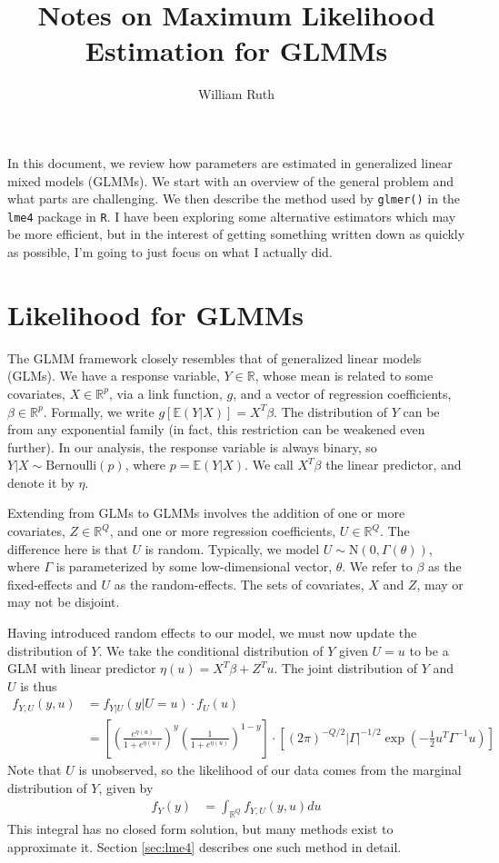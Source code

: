 \documentclass{article}
\title{Notes on Maximum Likelihood Estimation for GLMMs}
\author{William Ruth}
\date{}
\newcommand{\bE}{\mathbb{E}}
\newcommand{\bR}{\mathbb{R}}
\begin{document}
\maketitle

In this document, we review how parameters are estimated in generalized linear mixed models (GLMMs). We start with an overview of the general problem and what parts are challenging. We then describe the method used by \texttt{glmer()} in the \texttt{lme4} package in \texttt{R}. I have been exploring some alternative estimators which may be more efficient, but in the interest of getting something written down as quickly as possible, I'm going to just focus on what I actually did.

\section{Likelihood for GLMMs}

The GLMM framework closely resembles that of generalized linear models (GLMs). We have a response variable, $Y \in \bR$, whose mean is related to some covariates, $X \in \bR^p$, via a link function, $g$, and a vector of regression coefficients, $\beta \in \bR^p$. Formally, we write $g[\bE(Y|X)] = X^T \beta$. The distribution of $Y$ can be from any exponential family (in fact, this restriction can be weakened even further). In our analysis, the response variable is always binary, so $Y|X \sim \mathrm{Bernoulli}(p)$, where $p = \bE(Y|X)$. We call $X^T \beta$ the linear predictor, and denote it by $\eta$.

Extending from GLMs to GLMMs involves the addition of one or more covariates, $Z \in \bR^Q$, and one or more regression coefficients, $U \in \bR^Q$. The difference here is that $U$ is random. Typically, we model $U \sim \mathrm{N}(0, \Gamma(\theta))$, where $\Gamma$ is parameterized by some low-dimensional vector, $\theta$. We refer to $\beta$ as the fixed-effects and $U$ as the random-effects. The sets of covariates, $X$ and $Z$, may or may not be disjoint.

Having introduced random effects to our model, we must now update the distribution of $Y$. We take the conditional distribution of $Y$ given $U=u$ to be a GLM with linear predictor $\eta(u) = X^T \beta + Z^T u$. The joint distribution of $Y$ and $U$ is thus
%
\begin{align}
    f_{Y,U}(y, u) &= f_{Y|U}(y | U=u) \cdot f_U(u)\\
    &= \left[ \left( \frac{e^{\eta(u)}}{1 + e^{\eta(u)}} \right)^y \left( \frac{1}{1 + e^{\eta(u)}} \right)^{1-y} \right] \cdot \left[ (2 \pi)^{-Q/2} |\Gamma|^{-1/2} \exp \left( - \frac{1}{2} u^T \Gamma^{-1} u \right)\right] \label{eq:fyu}
\end{align}
%
Note that $U$ is unobserved, so the likelihood of our data comes from the marginal distribution of $Y$, given by
%
\begin{align}
    f_Y(y) &= \int_{\bR^Q} f_{Y,U}(y,u) du \label{eq:fy_int}
\end{align}
%
This integral has no closed form solution, but many methods exist to approximate it. Section \ref{sec:lme4} describes one such method in detail.
\end{document}
